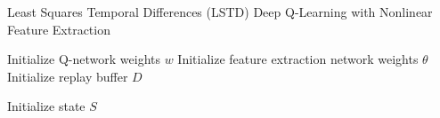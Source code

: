 \documentclass{article}
\begin{document}
\begin{algorithm}
    \caption{Least Squares Temporal Differences (LSTD) Deep Q-Learning with Nonlinear Feature Extraction}
    \begin{algorithmic}[1]
        \State Initialize Q-network weights \(w\)
        \State Initialize feature extraction network weights \(\theta\)
        \State Initialize replay buffer \(D\)
        
            \State Initialize state \(S\)
        \EndFor
    \end{algorithmic}
\end{algorithm}
\end{document}
